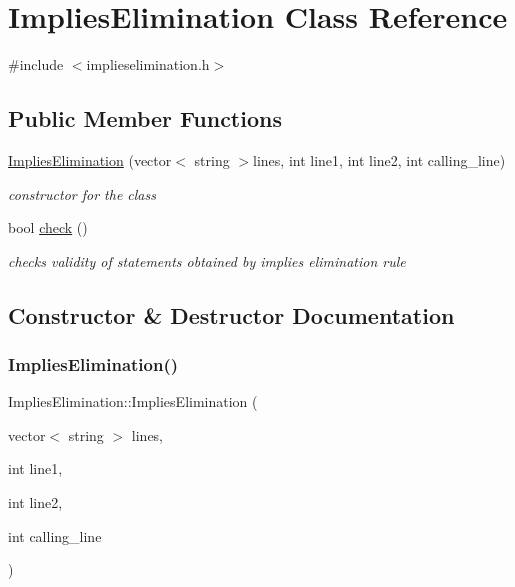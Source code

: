 \hypertarget{class_implies_elimination}{}\section{Implies\+Elimination Class Reference}
\label{class_implies_elimination}


{\ttfamily \#include $<$implieselimination.\+h$>$}

\subsection*{Public Member Functions}
\begin{DoxyCompactItemize}
\item 
\mbox{\hyperlink{class_implies_elimination_ab6aacafcb368bc8ac28ab1bdd4c8bb9c}{Implies\+Elimination}} (vector$<$ string $>$lines, int line1, int line2, int calling\+\_\+line)
\begin{DoxyCompactList}\small\item\em constructor for the class \end{DoxyCompactList}\item 
bool \mbox{\hyperlink{class_implies_elimination_a02bc168a71a6657e63f572e95a298f06}{check}} ()
\begin{DoxyCompactList}\small\item\em checks validity of statements obtained by implies elimination rule \end{DoxyCompactList}\end{DoxyCompactItemize}


\subsection{Constructor \& Destructor Documentation}
\mbox{\label{class_implies_elimination_ab6aacafcb368bc8ac28ab1bdd4c8bb9c}} 
\subsubsection{\texorpdfstring{Implies\+Elimination()}{ImpliesElimination()}}
{\footnotesize\ttfamily Implies\+Elimination\+::\+Implies\+Elimination (\begin{DoxyParamCaption}\item[{vector$<$ string $>$}]{lines,  }\item[{int}]{line1,  }\item[{int}]{line2,  }\item[{int}]{calling\+\_\+line }\end{DoxyParamCaption})\hspace{0.3cm}{\ttfamily [inline]}}



